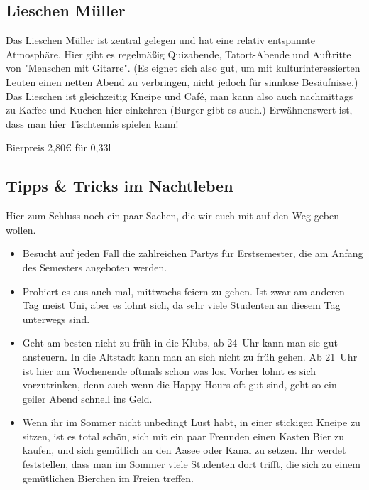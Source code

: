 {\begin{multicols*}{2}
\begin{center}
\end{center}

\subsection{Lieschen Müller} %
Das Lieschen Müller ist zentral gelegen und hat eine relativ entspannte Atmosphäre. Hier gibt es regelmäßig Quizabende, Tatort-Abende und Auftritte von "Menschen mit Gitarre". (Es eignet sich also gut, um mit kulturinteressierten Leuten einen netten Abend zu verbringen, nicht jedoch für sinnlose Besäufnisse.) Das Lieschen ist gleichzeitig Kneipe und Café, man kann also auch nachmittags zu Kaffee und Kuchen hier einkehren (Burger gibt es auch.) Erwähnenswert ist, dass man hier Tischtennis spielen kann!

Bierpreis 2,80€ für 0,33l

\begin{center}
\end{center}

\setcounter{secnumdepth}{\value{fibtemp}}
\subsection{Tipps \& Tricks im Nachtleben}
Hier zum Schluss noch ein paar Sachen, die wir euch mit auf den Weg geben wollen.
\begin{itemize}[labelsep=*, leftmargin=1.2em]
	\item Besucht auf jeden Fall die zahlreichen Partys für Erstsemester, die am Anfang des Semesters angeboten werden.
	\item Probiert es aus auch mal, mittwochs feiern zu gehen.
	Ist zwar am anderen Tag meist Uni, aber es lohnt sich, da sehr viele Studenten an diesem Tag unterwegs sind.
	\item Geht am besten nicht zu früh in die Klubs, ab 24~Uhr kann man sie gut ansteuern.
	In die Altstadt kann man an sich nicht zu früh gehen.
	Ab 21~Uhr ist hier am Wochenende oftmals schon was los.
	Vorher lohnt es sich vorzutrinken, denn auch wenn die Happy Hours oft gut sind, geht so ein geiler Abend schnell ins Geld.
	\item Wenn ihr im Sommer nicht unbedingt Lust habt, in einer stickigen Kneipe zu sitzen, ist es total schön, sich mit ein paar Freunden einen Kasten Bier zu kaufen, und sich gemütlich an den Aasee oder Kanal zu setzen.
	Ihr werdet feststellen, dass man im Sommer viele Studenten dort trifft, die sich zu einem gemütlichen Bierchen im Freien treffen.
\end{itemize}

\end{multicols*}

}
